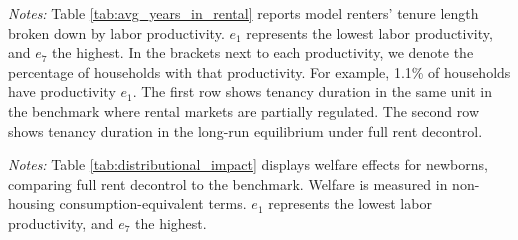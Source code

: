\documentclass[parskip=full]{article}
\newenvironment{fignote2}[1]
{
\par
\medskip
\begin{minipage}{#1}
\footnotesize
}
{
\end{minipage}
}
\begin{document}
\begin{table}[H]
    \centering
    \caption{Avg. years in same rental unit by labor productivity for all renters}
    \vspace{-0.5cm}
    \label{tab:avg_years_in_rental}
    
    \vspace{-0.45cm}
    \begin{fignote2}{1.04\textwidth}
      \textit{Notes:} Table \ref{tab:avg_years_in_rental} reports model renters' tenure length broken down by labor productivity. $e_{1}$ represents the lowest labor productivity, and $e_{7}$ the highest. In the brackets next to each productivity, we denote the percentage of households with that productivity. For example, 1.1\% of households have productivity $e_{1}$. The first row shows tenancy duration in the same unit in the benchmark where rental markets are partially regulated. The second row shows tenancy duration in the long-run equilibrium under full rent decontrol.
    \end{fignote2}
\end{table}

    
\begin{table}[H]
    \centering
    \caption{Newborns' welfare gains and losses by labor productivity}
    \vspace{-0.5cm}
    \label{tab:distributional_impact}
    
    \vspace{-0.45cm}
    \begin{fignote2}{0.91\textwidth}
      \textit{Notes:} Table \ref{tab:distributional_impact} displays welfare effects for newborns, comparing full rent decontrol to the benchmark. Welfare is measured in non-housing consumption-equivalent terms. $e_{1}$ represents the lowest labor productivity, and $e_{7}$ the highest. %
    \end{fignote2}
\end{table}
\end{document}
